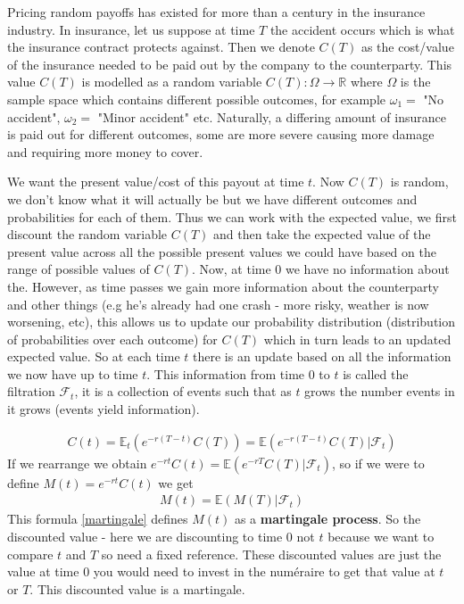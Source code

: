 \documentclass[9pt]{extarticle}
\begin{document}
Pricing random payoffs has existed for more than a century in the insurance industry. In insurance, let us suppose at time $T$ the 
accident occurs which is what the insurance contract protects against. Then we denote $C(T)$ as the cost/value of the insurance needed to be 
paid out by the company to the counterparty. This value $C(T)$ is modelled as a random variable $C(T):\Omega \to \mathbb{R}$ where $\Omega$ is the 
sample space which contains different possible outcomes, for example $\omega_1 =$ "No accident", $\omega_2 =$ "Minor accident" etc. 
Naturally, a differing amount of insurance is paid out for different outcomes, some are more severe causing more damage and 
requiring more money to cover.

We want the present value/cost of this payout at time $t$. Now $C(T)$ is random, we don't know what it will actually be but we have 
different outcomes and probabilities for each of them. Thus we can work with 
the expected value, we first discount the random variable $C(T)$ and then take the expected value of the 
present value across all the possible present values we could have based on the range of possible 
values of $C(T)$. Now, at time $0$ we have no information about the. However, as time passes we gain more 
information about the counterparty and other things (e.g he's already had one crash - more risky, weather is now worsening, etc), 
this allows us to update our probability distribution (distribution of probabilities over each outcome) 
for $C(T)$ which in turn leads to an updated expected value. So at each time $t$ there is an update 
based on all the information we now have up to time $t$. This information from time $0$ to $t$ is called 
the filtration $\mathcal{F}_t$, it is a collection of events such that as $t$ grows the number 
events in it grows (events yield information).

\begin{align}\label{insurance}
  C(t) = \mathbb{E}_t(e^{-r(T-t)}C(T)) = \mathbb{E}(e^{-r(T-t)}C(T)| \mathcal{F}_t)
\end{align}
If we rearrange we obtain $e^{-rt}C(t) = \mathbb{E}(e^{-rT}C(T)| \mathcal{F}_t)$, so if we were to define $M(t) = e^{-rt} C(t)$ we 
get 
\begin{align}\label{martingale}
 M(t) = \mathbb{E}(M(T)| \mathcal{F}_t) 
\end{align}
This formula \eqref{martingale} defines $M(t)$ as a \textbf{martingale process}. So the discounted value - here 
we are discounting to time $0$ not $t$ because we want to compare $t$ and $T$ so need a fixed reference. These 
discounted values are just the value at time $0$ you would need to invest in the num\'eraire to get that 
value at $t$ or $T$. This discounted value is a martingale.
\end{document}
